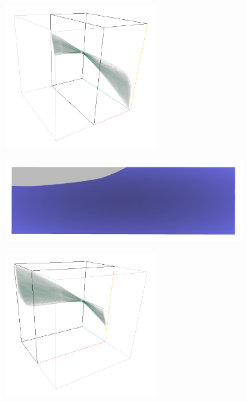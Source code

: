\documentclass[a4paper,fontsize=12pt,toc=bib,parskip=half,ngerman]{scrartcl}
\begin{document}
\begin{figure}
	\begin{subfigure}{0.4\textwidth}
		\centering
		\includegraphics[height=5.5cm]{pictures/results/Beam/Beam_InvariantSpace1.png}
		\subcaption{}
		\label{BeamInvariant1}
	\end{subfigure}
	\hspace*{\fill}
	\begin{subfigure}{0.4\textwidth}
		\centering
		\includegraphics[width=\textwidth]{pictures/results/Beam/Beam_Object1.png}
		\subcaption{}
		\label{BeamObject1}
	\end{subfigure}
	\medskip
	\begin{subfigure}{0.4\textwidth}
		\centering
		\includegraphics[height=5.5cm]{pictures/results/Beam/Beam_InvariantSpace2.png}
		\subcaption{}
		\label{BeamInvariant2}
	\end{subfigure}
	\hspace*{\fill}
	\begin{subfigure}{0.4\textwidth}

\end{subfigure}
\end{figure}
\end{document}
